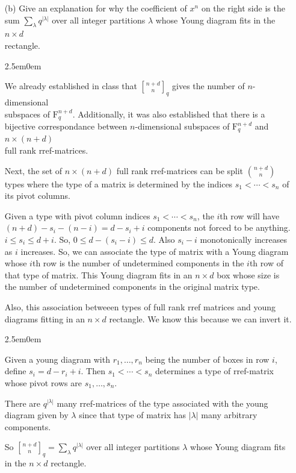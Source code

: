 \documentclass{book}
\newcommand{\exOne}{%
   \color{Purple}%
   \fontsize{13}{15}\selectfont%
}
\newcommand{\exTwoP}{%
   \color{RedViolet}%
   \fontsize{13}{15}\selectfont%
}
\newenvironment{myIndent}{%
   \begin{adjustwidth}{2.5em}{0em}%
}{%
   \end{adjustwidth}%
}
\newcommand{\brm}[1]{\bm{\mathrm{#1}}}
\newcommand{\qbinom}{\genfrac{[}{]}{0pt}{}}
\newcommand{\retTwo}{\hfill\bigbreak}
\begin{document}
\begin{enumerate}
   \item[(b)] Give an explanation for why the coefficient of $x^n$ on the right side is the sum $\sum_\lambda q^{|\lambda|}$ over all integer partitions $\lambda$ whose Young diagram fits in the $n \times d$\\ rectangle.
   
   \begin{myIndent}\exOne
      We already established in class that $\qbinom{n+d}{n}_q$ gives the number of $n$-dimensional\\ [-1pt] subspaces of $\brm{F}_q^{n + d}$. Additionally, it was also established that there is a bijective correspondance between $n$-dimensional subspaces of $\brm{F}_q^{n + d}$ and $n \times (n + d)$\\ [3pt] full rank rref-matrices.\retTwo

      Next, the set of $n \times (n + d)$ full rank rref-matrices can be split $\binom{n+d}{n}$ types where the type of a matrix is determined by the indices $s_1 < \cdots < s_n$ of its pivot columns.\retTwo

      Given a type with pivot column indices $s_1 < \cdots < s_n$, the $i$th row will have $(n + d) - s_i - (n - i) = d - s_i + i$ components not forced to be anything.\\ $i \leq s_i \leq d + i$. So, $0 \leq d - (s_i - i) \leq d$. Also $s_i - i$ monotonically increases as $i$ increases. So, we can associate the type of matrix with a Young diagram whose $i$th row is the number of undetermined components in the $i$th row of that type of matrix. This Young diagram fits in an $n \times d$ box whose size is the number of undetermined components in the original matrix type.\retTwo
      
      Also, this association betweeen types of full rank rref matrices and young\\ diagrams fitting in an $n \times d$ rectangle. We know this because we can invert it.
      \begin{myIndent}\exTwoP
         Given a young diagram with $r_1, \ldots, r_n$ being the number of boxes in row $i$, define $s_i = d - r_i + i$. Then $s_1 < \cdots < s_n$ determines a type of rref-matrix whose pivot rows are $s_1, \ldots, s_n$.\newpage
      \end{myIndent}
      
      There are $q^{|\lambda|}$ many rref-matrices of the type associated with the young diagram given by $\lambda$ since that type of matrix has $|\lambda|$ many arbitrary components.\retTwo

      So $\qbinom{n + d}{n}_q = \sum_\lambda q^{|\lambda|}$ over all integer partitions $\lambda$ whose Young diagram fits in the $n \times d$ rectangle.
      \retTwo
   \end{myIndent}
\end{enumerate}
\end{document}
